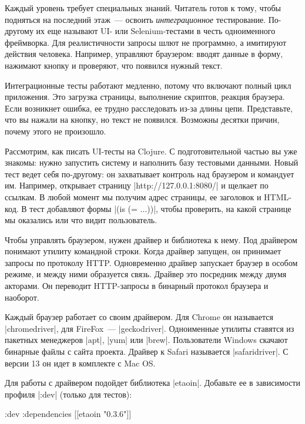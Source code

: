 Каждый уровень требует специальных знаний. Читатель готов к тому, чтобы
подняться на последний этаж~--- освоить \emph{интеграционное}
тестирование. По-другому их еще называют UI- или Selenium-тестами в честь
одноименного фреймворка. Для реалистичности запросы шлют не программно, а
имитируют действия человека. Например, управляют браузером: вводят данные в
форму, нажимают кнопку и проверяют, что появился нужный текст.

Интеграционные тесты работают медленно, потому что включают полный цикл
приложения. Это загрузка страницы, выполнение скриптов, реакция браузера. Если
возникнет ошибка, ее трудно расследовать из-за длины цепи. Представьте, что вы
нажали на кнопку, но текст не появился. Возможны десятки причин, почему этого не
произошло.

Рассмотрим, как писать UI-тесты на Clojure. С подготовительной частью вы уже
знакомы: нужно запустить систему и наполнить базу тестовыми данными. Новый тест
ведет себя по-другому: он захватывает контроль над браузером и командует
им. Например, открывает страницу \spverb|http://127.0.0.1:8080/| и щелкает по
ссылкам. В любой момент мы получим адрес страницы, ее заголовок и HTML-код. В
тест добавляют формы \spverb|(is (= ...))|, чтобы проверить, на какой странице
мы оказались или что видит пользователь.

Чтобы управлять браузером, нужен драйвер и библиотека к нему. Под драйвером
понимают утилиту командной строки. Когда драйвер запущен, он принимает запросы
по протоколу HTTP. Одновременно драйвер запускает браузер в особом режиме, и
между ними образуется связь. Драйвер это посредник между двумя акторами. Он
переводит HTTP-запросы в бинарный протокол браузера и наоборот.

Каждый браузер работает со своим драйвером. Для Chrome он называется
\spverb|chromedriver|, для FireFox~--- \spverb|geckodriver|. Одноименные утилиты
ставятся из пакетных менеджеров \spverb|apt|, \spverb|yum| или
\spverb|brew|. Пользователи Windows скачают бинарные файлы с сайта
проекта. Драйвер к Safari называется \spverb|safaridriver|. С версии 13 он идет
в комплекте с Mac OS.

Для работы с драйвером подойдет библиотека
\spverb|etaoin|. Добавьте ее в
зависимости профиля \spverb|:dev| (только для тестов):

\begin{english}
  \begin{clojure}
:dev {:dependencies [[etaoin "0.3.6"]]}
  \end{clojure}
\end{english}

